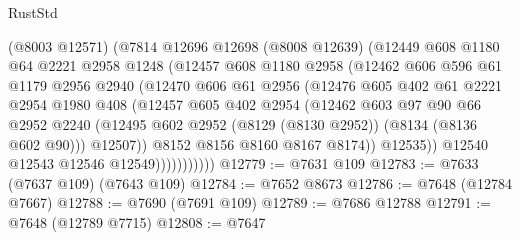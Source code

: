 \begin{lexlean}{RustStd}
\begin{coremodule}
                      (@8003 @12571)
                      (@7814
                        @12696
                        @12698
                        (@8008 @12639)
                        (@12449
                          @608
                          @1180
                          @64
                          @2221
                          @2958
                          @1248
                          (@12457
                            @608
                            @1180
                            @2958
                            (@12462
                              @606
                              @596
                              @61
                              @1179
                              @2956
                              @2940
                              (@12470
                                @606
                                @61
                                @2956
                                (@12476
                                  @605
                                  @402
                                  @61
                                  @2221
                                  @2954
                                  @1980
                                  @408
                                  (@12457
                                    @605
                                    @402
                                    @2954
                                    (@12462
                                      @603
                                      @97
                                      @90
                                      @66
                                      @2952
                                      @2240
                                      (@12495
                                        @602
                                        @2952
                                        (@8129 (@8130 @2952))
                                        (@8134 (@8136 @602 @90)))
                                      @12507))
                                  @8152
                                  @8156
                                  @8160
                                  @8167
                                  @8174))
                              @12535))
                          @12540
                          @12543
                          @12546
                          @12549)))))))))))
@12779 := @7631 @109
@12783 := @7633 (@7637 @109) (@7643 @109)
@12784 := @7652 @8673
@12786 := @7648 (@12784 @7667)
@12788 := @7690 (@7691 @109)
@12789 := @7686 @12788
@12791 := @7648 (@12789 @7715)
@12808 := @7647

\end{coremodule}
\end{lexlean}
